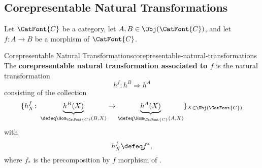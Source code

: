 \subsection{Corepresentable Natural Transformations}\label{subsection-corepresentable-natural-transformations}
Let $\CatFont{C}$ be a category, let $A,B\in\Obj(\CatFont{C})$, and let $f\colon A\to B$ be a morphism of $\CatFont{C}$.
\begin{definition}{Corepresentable Natural Transformations}{corepresentable-natural-transformations}%
    The \textbf{corepresentable natural transformation associated to $f$} is the natural transformation
    \[
        h^{f}%
        \colon%
        h^{B}%
        \Rightarrow%
        h^{A}%
    \]%
    consisting of the collection
    \[
        \{
            h^{f}_{X}
            \colon
            \underbrace{h^{B}(X)}_{\defeq\Hom_{\CatFont{C}}(B,X)}
            \to
            \underbrace{h^{A}(X)}_{\defeq\Hom_{\CatFont{C}}(A,X)}
        \}_{X\in\Obj(\CatFont{C})}
    \]%
    with
    \[
        h^{f}_{X}
        \defeq
        f^{*},
    \]%
    where $f_{*}$ is the precomposition by $f$ morphism of .
\end{definition}
